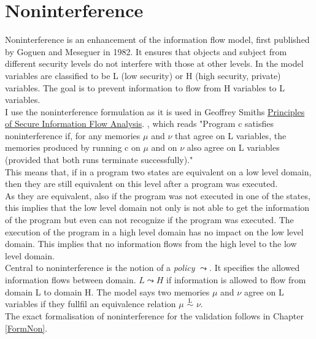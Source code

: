 \section{Noninterference}
Noninterference is an enhancement of the information flow model, first published by Goguen and Meseguer in 1982. It ensures that objects and subject from different security levels do not interfere with those at other levels. In the model variables are classified to be L (low security) or H (high security, private) variables. The goal is to prevent information to flow from H variables to L variables. \\
I use the noninterference formulation as it is used in Geoffrey Smiths \href{http://users.cis.fiu.edu/~smithg/papers/sif06.pdf}{%
		Principles of Secure Information Flow Analysis}. \cite{InfFlow}, which reads "Program c satisfies noninterference if, for any memories $\mu$ and $\nu$ that agree on L variables, the memories produced by running c on $\mu$ and on $\nu$ also agree on L variables (provided that both runs terminate successfully)." \\
This means that, if in a program two states are equivalent on a low level domain, then they are still equivalent on this level after a program was executed.\\ As they are equivalent, also if the program was not executed in one of the states, this implies that the low level domain not only is not able to get the information of the program but even can not recognize if the program was executed. The execution of the program in a high level domain has no impact on the low level domain. This implies that no information flows from the high level to the low level domain. \\
Central to noninterference is the notion of a \textit{policy} $\leadsto$. It specifies the allowed information  flows between domain. $L \leadsto H$ if information is allowed to flow from domain L to domain H. The model says two memories $\mu$ and $\nu$ agree on L variables if they fullfil an equivalence relation $\mu$ $\overset{\text{L}}{\sim}$ $\nu$. \\
The exact formalisation of noninterference for the validation follows in Chapter \ref{FormNon}.